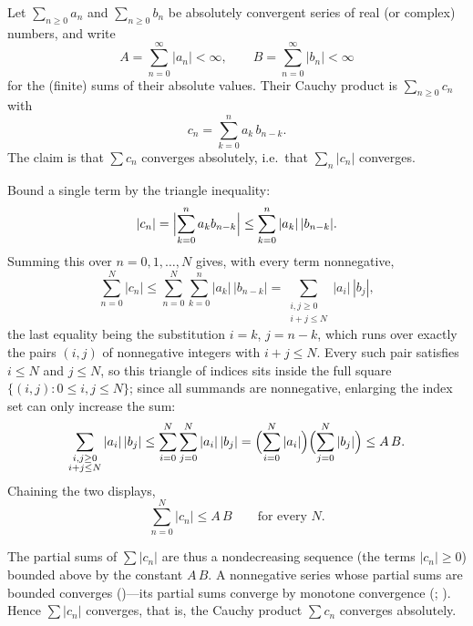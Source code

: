 \documentclass[main.tex]{subfiles}
\begin{document}
\begin{SolutionBlue}
Let $\sum_{n\ge 0}a_{n}$ and $\sum_{n\ge 0}b_{n}$ be absolutely convergent series of real (or complex)
numbers, and write
\[
A=\sum_{n=0}^{\infty}|a_{n}|<\infty,\qquad B=\sum_{n=0}^{\infty}|b_{n}|<\infty
\]
for the (finite) sums of their absolute values. Their Cauchy product is $\sum_{n\ge 0}c_{n}$ with
\[
c_{n}=\sum_{k=0}^{n}a_{k}\,b_{n-k}.
\]
The claim is that $\sum c_{n}$ converges absolutely, i.e.\ that $\sum_{n}|c_{n}|$ converges.

Bound a single term by the triangle inequality:
\[
|c_{n}|=\Bigl|\sum_{k=0}^{n}a_{k}b_{n-k}\Bigr|\le\sum_{k=0}^{n}|a_{k}|\,|b_{n-k}|.
\]
Summing this over $n=0,1,\dots,N$ gives, with every term nonnegative,
\[
\sum_{n=0}^{N}|c_{n}|\le\sum_{n=0}^{N}\sum_{k=0}^{n}|a_{k}|\,|b_{n-k}|
=\sum_{\substack{i,j\ge 0\\ i+j\le N}}|a_{i}|\,|b_{j}|,
\]
the last equality being the substitution $i=k$, $j=n-k$, which runs over exactly the pairs $(i,j)$ of
nonnegative integers with $i+j\le N$. Every such pair satisfies $i\le N$ and $j\le N$, so this triangle
of indices sits inside the full square $\{(i,j):0\le i,j\le N\}$; since all summands are nonnegative,
enlarging the index set can only increase the sum:
\[
\sum_{\substack{i,j\ge 0\\ i+j\le N}}|a_{i}|\,|b_{j}|
\le\sum_{i=0}^{N}\sum_{j=0}^{N}|a_{i}|\,|b_{j}|
=\Bigl(\sum_{i=0}^{N}|a_{i}|\Bigr)\Bigl(\sum_{j=0}^{N}|b_{j}|\Bigr)\le A\,B.
\]
Chaining the two displays,
\[
\sum_{n=0}^{N}|c_{n}|\le A\,B\qquad\text{for every }N.
\]

The partial sums of $\sum|c_{n}|$ are thus a nondecreasing sequence (the terms $|c_{n}|\ge 0$) bounded
above by the constant $A\,B$. A nonnegative series whose partial sums are bounded converges
()---its partial sums converge by monotone convergence
(; ). Hence $\sum|c_{n}|$
converges, that is, the Cauchy product $\sum c_{n}$ converges absolutely.
\end{SolutionBlue}
\end{document}
